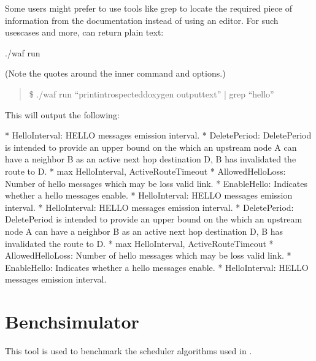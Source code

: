 \documentclass[letterpaper,10pt,english]{sphinxmanual}
\begin{document}
Some users might prefer to use tools like grep
to locate the required piece of information from the documentation
instead of using an editor. For such uses\sphinxhyphen{}cases and more,
 can return plain text:

\begin{sphinxVerbatim}[commandchars=\\\{\}]
\PYGZdl{} ./waf \PYGZhy{}\PYGZhy{}run 
\end{sphinxVerbatim}

(Note the quotes around the inner command and options.)
\begin{quote}

\$ ./waf \textendash{}run “print\sphinxhyphen{}introspected\sphinxhyphen{}doxygen \textendash{}output\sphinxhyphen{}text” | grep “hello”
\end{quote}

This will output the following:

\begin{sphinxVerbatim}[commandchars=\\\{\}]
* HelloInterval: HELLO messages emission interval.
* DeletePeriod: DeletePeriod is intended to provide an upper bound on the   which an upstream node A can have a neighbor B as an active next hop  destination D,  B has invalidated the route to D.   * max HelloInterval, ActiveRouteTimeout
* AllowedHelloLoss: Number of hello messages which may be loss  valid link.
* EnableHello: Indicates whether a hello messages enable.
* HelloInterval: HELLO messages emission interval.
* HelloInterval: HELLO messages emission interval.
* DeletePeriod: DeletePeriod is intended to provide an upper bound on the   which an upstream node A can have a neighbor B as an active next hop  destination D,  B has invalidated the route to D.   * max HelloInterval, ActiveRouteTimeout
* AllowedHelloLoss: Number of hello messages which may be loss  valid link.
* EnableHello: Indicates whether a hello messages enable.
* HelloInterval: HELLO messages emission interval.
\end{sphinxVerbatim}


\section{Bench\sphinxhyphen{}simulator}
\label{\detokenize{utilities:bench-simulator}}
This tool is used to benchmark the scheduler algorithms used in .
\end{document}
